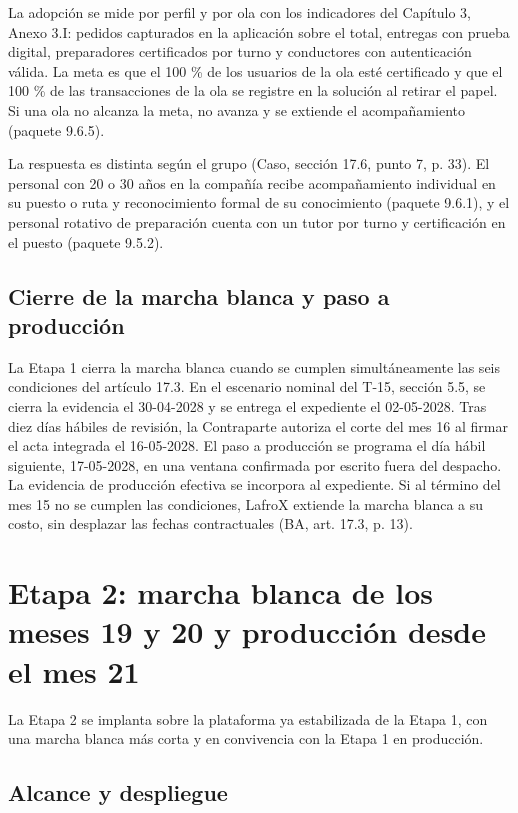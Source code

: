 La adopción se mide por perfil y por ola con los indicadores del Capítulo 3, Anexo 3.I: pedidos capturados en la aplicación sobre el total, entregas con prueba digital, preparadores certificados por turno y conductores con autenticación válida. La meta es que el 100 \% de los usuarios de la ola esté certificado y que el 100 \% de las transacciones de la ola se registre en la solución al retirar el papel. Si una ola no alcanza la meta, no avanza y se extiende el acompañamiento (paquete 9.6.5).

La respuesta es distinta según el grupo (Caso, sección 17.6, punto 7, p. 33). El personal con 20 o 30 años en la compañía recibe acompañamiento individual en su puesto o ruta y reconocimiento formal de su conocimiento (paquete 9.6.1), y el personal rotativo de preparación cuenta con un tutor por turno y certificación en el puesto (paquete 9.5.2).

\subsection{Cierre de la marcha blanca y paso a producción}

La Etapa 1 cierra la marcha blanca cuando se cumplen simultáneamente las seis condiciones del artículo 17.3. En el escenario nominal del T-15, sección 5.5, se cierra la evidencia el 30-04-2028 y se entrega el expediente el 02-05-2028. Tras diez días hábiles de revisión, la Contraparte autoriza el corte del mes 16 al firmar el acta integrada el 16-05-2028. El paso a producción se programa el día hábil siguiente, 17-05-2028, en una ventana confirmada por escrito fuera del despacho. La evidencia de producción efectiva se incorpora al expediente. Si al término del mes 15 no se cumplen las condiciones, LafroX extiende la marcha blanca a su costo, sin desplazar las fechas contractuales (BA, art. 17.3, p. 13).

\section{Etapa 2: marcha blanca de los meses 19 y 20 y producción desde el mes 21}

La Etapa 2 se implanta sobre la plataforma ya estabilizada de la Etapa 1, con una marcha blanca más corta y en convivencia con la Etapa 1 en producción.

\subsection{Alcance y despliegue}

